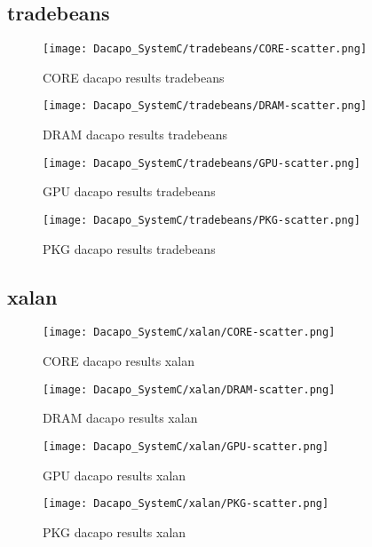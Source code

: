 \documentclass{article}
\begin{document}
\subsection{tradebeans}
    \begin{figure}[H]
    	\centering
    	\texttt{[image: Dacapo\_SystemC/tradebeans/CORE-scatter.png]}
    	\caption{CORE dacapo results tradebeans}
    	\label{fig:tradebeans-CORE}
    \end{figure}
    \begin{figure}[H]
    	\centering
    	\texttt{[image: Dacapo\_SystemC/tradebeans/DRAM-scatter.png]}
    	\caption{DRAM dacapo results tradebeans}
    	\label{fig:tradebeans-fix-DRAM}
    \end{figure}
    \begin{figure}[H]
    	\centering
    	\texttt{[image: Dacapo\_SystemC/tradebeans/GPU-scatter.png]}
    	\caption{GPU dacapo results tradebeans}
    	\label{fig:tradebeans-fix-GPU}
    \end{figure}
    \begin{figure}[H]
    	\centering
    	\texttt{[image: Dacapo\_SystemC/tradebeans/PKG-scatter.png]}
    	\caption{PKG dacapo results tradebeans}
    	\label{fig:tradebeans-fix-PKG}
    \end{figure}
    


\subsection{xalan}
    \begin{figure}[H]
    	\centering
    	\texttt{[image: Dacapo\_SystemC/xalan/CORE-scatter.png]}
    	\caption{CORE dacapo results xalan}
    	\label{fig:xalan-CORE}
    \end{figure}
    \begin{figure}[H]
    	\centering
    	\texttt{[image: Dacapo\_SystemC/xalan/DRAM-scatter.png]}
    	\caption{DRAM  dacapo results xalan}
    	\label{fig:xalan-fix-DRAM}
    \end{figure}
    \begin{figure}[H]
    	\centering
    	\texttt{[image: Dacapo\_SystemC/xalan/GPU-scatter.png]}
    	\caption{GPU dacapo results xalan}
    	\label{fig:xalan-fix-GPU}
    \end{figure}
    \begin{figure}[H]
    	\centering
    	\texttt{[image: Dacapo\_SystemC/xalan/PKG-scatter.png]}
    	\caption{PKG dacapo results xalan}
    	\label{fig:xalan-fix-PKG}
    \end{figure}
\end{document}

